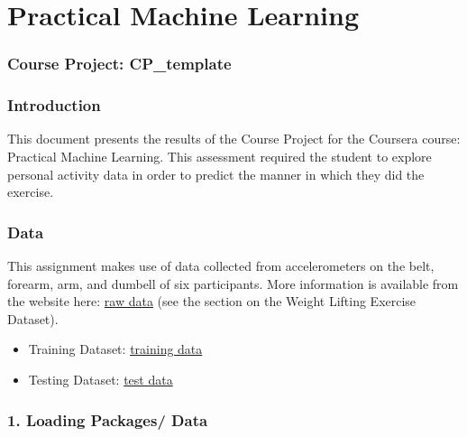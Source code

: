 \documentclass[]{article}
\title{}
\author{}
\date{}
\begin{document}
\maketitle


\section{Practical Machine Learning}\label{practical-machine-learning}

\subsubsection{Course Project:
CP\_template}\label{course-project-cpux5ftemplate}

\subsubsection{Introduction}\label{introduction}

This document presents the results of the Course Project for the
Coursera course: Practical Machine Learning. This assessment required
the student to explore personal activity data in order to predict the
manner in which they did the exercise.

\subsubsection{Data}\label{data}

This assignment makes use of data collected from accelerometers on the
belt, forearm, arm, and dumbell of six participants. More information is
available from the website here:
\href{http://groupware.les.inf.puc-rio.br/har}{raw data} (see the
section on the Weight Lifting Exercise Dataset).

\begin{itemize}
\itemsep1pt\parskip0pt
\item
  Training Dataset:
  \href{https://d396qusza40orc.cloudfront.net/predmachlearn/pml-training.csv}{training
  data}
\item
  Testing Dataset:
  \href{https://d396qusza40orc.cloudfront.net/predmachlearn/pml-testing.csv}{test
  data}
\end{itemize}

\subsubsection{1. Loading Packages/ Data}\label{loading-packages-data}
\end{document}
